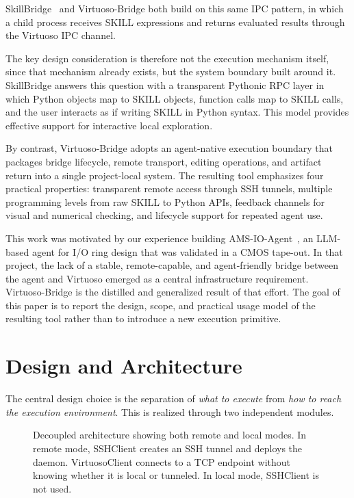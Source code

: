 \documentclass[lettersize,journal]{ieee_template/IEEEtran}
\begin{document}
SkillBridge~\cite{skillbridge} and Virtuoso-Bridge both build on this same IPC pattern, in which a child process receives SKILL expressions and returns evaluated results through the Virtuoso IPC channel.

The key design consideration is therefore not the execution mechanism itself, since that mechanism already exists, but the system boundary built around it. SkillBridge answers this question with a transparent Pythonic RPC layer in which Python objects map to SKILL objects, function calls map to SKILL calls, and the user interacts as if writing SKILL in Python syntax. This model provides effective support for interactive local exploration.

By contrast, Virtuoso-Bridge adopts an agent-native execution boundary that packages bridge lifecycle, remote transport, editing operations, and artifact return into a single project-local system. The resulting tool emphasizes four practical properties: transparent remote access through SSH tunnels, multiple programming levels from raw SKILL to Python APIs, feedback channels for visual and numerical checking, and lifecycle support for repeated agent use.

This work was motivated by our experience building AMS-IO-Agent~\cite{amsioagent}, an LLM-based agent for I/O ring design that was validated in a CMOS tape-out. In that project, the lack of a stable, remote-capable, and agent-friendly bridge between the agent and Virtuoso emerged as a central infrastructure requirement. Virtuoso-Bridge is the distilled and generalized result of that effort. The goal of this paper is to report the design, scope, and practical usage model of the resulting tool rather than to introduce a new execution primitive.

\section{Design and Architecture}

The central design choice is the separation of \emph{what to execute} from \emph{how to reach the execution environment}. This is realized through two independent modules.

\begin{figure}[!t]
\centering
\resizebox{\textwidth}{!}{}
\caption{Decoupled architecture showing both remote and local modes. In remote mode, SSHClient creates an SSH tunnel and deploys the daemon. VirtuosoClient connects to a TCP endpoint without knowing whether it is local or tunneled. In local mode, SSHClient is not used.}
\label{fig:architecture}
\end{figure}
\end{document}
